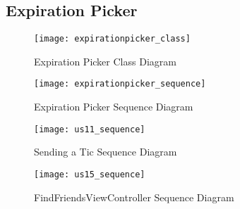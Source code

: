 \subsection{Expiration Picker}
\begin{figure}[H]
    \centering
    \texttt{[image: expirationpicker\_class]}
    \caption{Expiration Picker Class Diagram}
    \label{fig:expirationpicker_classdiagram}
\end{figure}

\begin{figure}[H]
    \centering
    \texttt{[image: expirationpicker\_sequence]}
    \caption{Expiration Picker Sequence Diagram}
    \label{fig:expirationpicker_sequence}
\end{figure}

\begin{figure}[H]
    \centering
    \texttt{[image: us11\_sequence]}
    \caption{Sending a Tic Sequence Diagram}
    \label{fig:us11_sequence}
\end{figure}




\begin{figure}[H]
    \centering
    \texttt{[image: us15\_sequence]}
    \caption{FindFriendsViewController Sequence Diagram}
    \label{fig:us15_sequence}
\end{figure}
